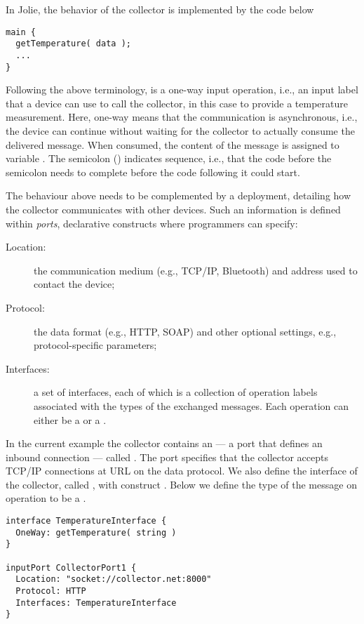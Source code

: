 In Jolie, the behavior of the collector is implemented by the code below
%
\begin{lstlisting}
main {
  getTemperature( data );
  ...
}
\end{lstlisting}
%
Following the above terminology,  is a
one-way input operation, i.e., an input label that a device can use to
call the collector, in this case to provide a temperature measurement.
Here, one-way means that the communication is asynchronous, i.e., the
device can continue without waiting for the collector to actually
consume the delivered message. When consumed, the content of the
message is assigned to variable . The semicolon
(\code{;}) indicates sequence, i.e., that the code before the
semicolon needs to complete before the code following it could start.

The behaviour above needs to be complemented by a deployment,
detailing how the collector communicates with other devices.
Such an information is defined within \emph{ports}, declarative
constructs where programmers can specify:
%
\begin{description}
  \item[Location:] the communication medium (e.g., TCP/IP, Bluetooth)
  and address used to contact the device;
  \item[Protocol:] the data format (e.g., HTTP, SOAP) and other optional settings, e.g., protocol-specific parameters;
  \item[Interfaces:] a set of interfaces, each of which is a collection
  of operation labels associated with the types of the exchanged messages. Each
  operation can either be a  or a
  .
\end{description}

In the current example the collector contains an
 --- a port that defines an inbound
connection --- called . The port specifies that the
collector accepts TCP/IP connections at URL
 on the  data protocol.
We also define the interface of the collector, called
, with construct
. Below we define the type of the message on operation
 to be a .

\begin{lstlisting}[xleftmargin=1em]
interface TemperatureInterface {
  OneWay: getTemperature( string )
}

inputPort CollectorPort1 {
  Location: "socket://collector.net:8000"
  Protocol: HTTP
  Interfaces: TemperatureInterface
}
\end{lstlisting}

